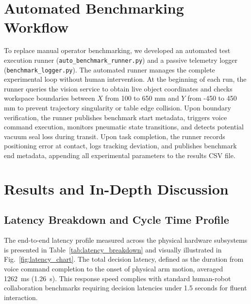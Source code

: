 \documentclass{svproc}
\begin{document}
\section{Automated Benchmarking Workflow}
\label{sec:benchmark_workflow}

To replace manual operator benchmarking, we developed an automated test execution runner (\texttt{auto\_benchmark\_runner.py}) and a passive telemetry logger (\texttt{benchmark\_logger.py}). The automated runner manages the complete experimental loop without human intervention. At the beginning of each run, the runner queries the vision service to obtain live object coordinates and checks workspace boundaries between $X$ from 100 to 650 mm and $Y$ from -450 to 450 mm to prevent trajectory singularity or table edge collision. Upon boundary verification, the runner publishes benchmark start metadata, triggers voice command execution, monitors pneumatic state transitions, and detects potential vacuum seal loss during transit. Upon task completion, the runner records positioning error at contact, logs tracking deviation, and publishes benchmark end metadata, appending all experimental parameters to the results CSV file.

\section{Results and In-Depth Discussion}
\label{sec:results}

\subsection{Latency Breakdown and Cycle Time Profile}
The end-to-end latency profile measured across the physical hardware subsystems is presented in Table~\ref{tab:latency_breakdown} and visually illustrated in Fig.~\ref{fig:latency_chart}. The total decision latency, defined as the duration from voice command completion to the onset of physical arm motion, averaged \SI{1262}{\milli\second} (\SI{1.26}{\second}). This response speed complies with standard human-robot collaboration benchmarks requiring decision latencies under 1.5 seconds for fluent interaction.
\end{document}
